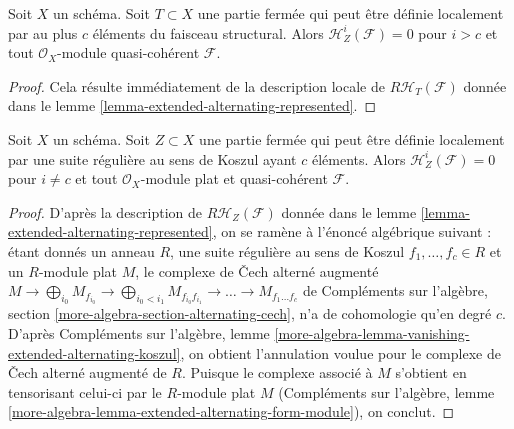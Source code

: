 \begin{lemma}
\label{lemma-supported-trivial-vanishing}
Soit $X$ un schéma. Soit $T \subset X$ une partie fermée qui peut
être définie localement par au plus $c$ éléments du faisceau structural.
Alors $\mathcal{H}^i_Z(\mathcal{F}) = 0$ pour $i > c$ et tout
$\mathcal{O}_X$-module quasi-cohérent $\mathcal{F}$.
\end{lemma}

\begin{proof}
Cela résulte immédiatement de la description locale de
$R\mathcal{H}_T(\mathcal{F})$ donnée dans
le lemme \ref{lemma-extended-alternating-represented}.
\end{proof}

\begin{lemma}
\label{lemma-supported-vanishing}
Soit $X$ un schéma. Soit $Z \subset X$ une partie fermée qui peut
être définie localement par une suite régulière au sens de Koszul ayant $c$ éléments.
Alors $\mathcal{H}^i_Z(\mathcal{F}) = 0$ pour $i \not = c$ et tout
$\mathcal{O}_X$-module plat et quasi-cohérent $\mathcal{F}$.
\end{lemma}

\begin{proof}
D'après la description de $R\mathcal{H}_Z(\mathcal{F})$ donnée dans
le lemme \ref{lemma-extended-alternating-represented}, on se ramène
à l'énoncé algébrique suivant : étant donnés un anneau $R$,
une suite régulière au sens de Koszul $f_1, \ldots, f_c \in R$ et un
$R$-module plat $M$, le complexe de {\v C}ech alterné augmenté
$M \to \bigoplus\nolimits_{i_0} M_{f_{i_0}} \to
\bigoplus\nolimits_{i_0 < i_1} M_{f_{i_0}f_{i_1}} \to
\ldots \to M_{f_1 \ldots f_c}$
de Compléments sur l'algèbre, section \ref{more-algebra-section-alternating-cech},
n'a de cohomologie qu'en degré $c$. D'après Compléments sur l'algèbre, lemme
\ref{more-algebra-lemma-vanishing-extended-alternating-koszul},
on obtient l'annulation voulue pour le complexe de
{\v C}ech alterné augmenté de $R$. Puisque le complexe associé à $M$ s'obtient
en tensorisant celui-ci par le $R$-module plat $M$
(Compléments sur l'algèbre, lemme
\ref{more-algebra-lemma-extended-alternating-form-module}),
on conclut.
\end{proof}

